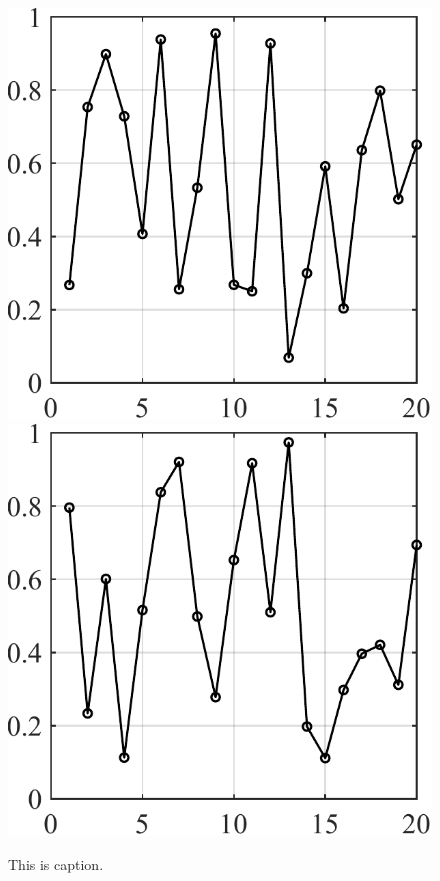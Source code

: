 \documentclass{article}
\begin{document}
\begin{figure}
	\includegraphics[height=\CE\textwidth, width=\CE\textwidth]{pic-3.pdf}\hfill
	\includegraphics[height=\CE\textwidth, width=\CE\textwidth]{pic-4.pdf}\hfill
	\caption{This is caption.}
	\label{fig}
\end{figure}
\end{document}
